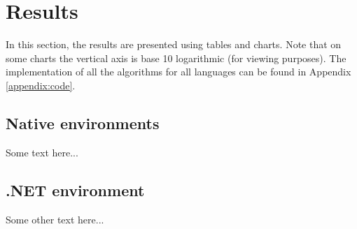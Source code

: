 \section{Results}
In this section, the results are presented using tables and charts. Note that on some charts the vertical axis is base 10 logarithmic (for viewing purposes). The implementation of all the algorithms for all languages can be found in Appendix \ref{appendix:code}.

\subsection{Native environments}
Some text here...







\subsection{.NET environment}
Some other text here...

%

%

%

%

